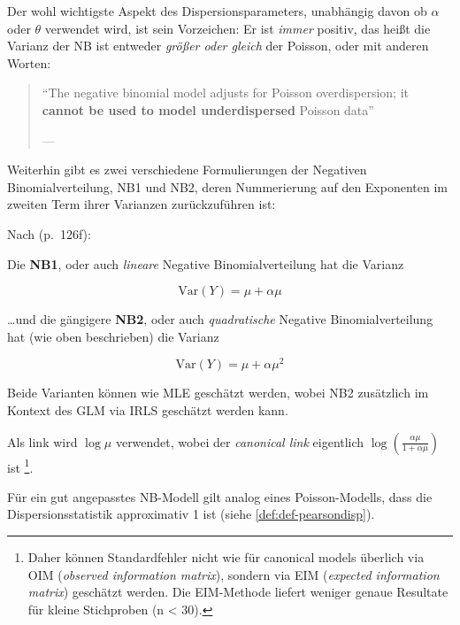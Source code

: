 \documentclass[ngerman,a4paper,]{scrartcl}
\let\rmarkdownfootnote\footnote%
\def\footnote{\protect\rmarkdownfootnote}
\theoremstyle{definition}
\theoremstyle{definition}
\theoremstyle{definition}
\theoremstyle{remark}
\let\BeginKnitrBlock\begin \let\EndKnitrBlock\end
\begin{document}
Der wohl wichtigste Aspekt des Dispersionsparameters, unabhängig davon ob \(\alpha\) oder \(\theta\) verwendet wird, ist sein Vorzeichen: Er ist \emph{immer} positiv, das heißt die Varianz der NB ist entweder \emph{größer oder gleich} der Poisson, oder mit anderen Worten:

\begin{quote}
\enquote{The negative binomial model adjusts for Poisson overdispersion; it \textbf{cannot be used to model underdispersed} Poisson data}

--- \citep[ (p.~11), eigene Hervorhebung]{hilbeModelingCountData2014}
\end{quote}

Weiterhin gibt es zwei verschiedene Formulierungen der Negativen Binomialverteilung, NB1 und NB2, deren Nummerierung auf den Exponenten im zweiten Term ihrer Varianzen zurückzuführen ist:

\BeginKnitrBlock{definition}[NB1 und NB2]
\protect\hypertarget{def:defNB1NB2}{}{\label{def:defNB1NB2} \iffalse (NB1 und NB2) \fi{} }Nach \citet{hilbeModelingCountData2014} (p.~126f):

Die \textbf{NB1}, oder auch \emph{lineare} Negative Binomialverteilung hat die Varianz

\begin{equation*}
\mathrm{Var}(Y) = \mu + \alpha \mu
\end{equation*}

\ldots{}und die gängigere \textbf{NB2}, oder auch \emph{quadratische} Negative Binomialverteilung hat (wie oben beschrieben) die Varianz

\begin{equation*}
\mathrm{Var}(Y) = \mu + \alpha \mu^2
\end{equation*}
\EndKnitrBlock{definition}

Beide Varianten können wie MLE geschätzt werden, wobei NB2 zusätzlich im Kontext des GLM via IRLS geschätzt werden kann.

Als link wird \(\log \mu\) verwendet, wobei der \emph{canonical link} eigentlich \(\log\left(\frac{\alpha\mu}{1 + \alpha\mu}\right)\) ist \footnote{Daher können Standardfehler nicht wie für canonical models überlich via OIM (\emph{observed information matrix}), sondern via EIM (\emph{expected information matrix}) geschätzt werden. Die EIM-Methode liefert weniger genaue Resultate für kleine Stichproben (n \textless{} 30).}.

Für ein gut angepasstes NB-Modell gilt analog eines Poisson-Modells, dass die Dispersionsstatistik approximativ 1 ist (siehe \ref{def:def-pearsondisp}).
\end{document}
